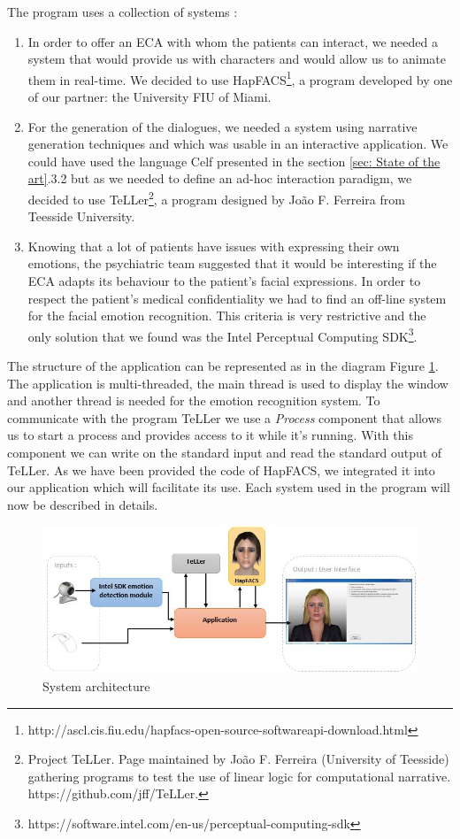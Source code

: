 \documentclass[11pt]{article}
\begin{document}
The program uses a collection of systems :
\begin{enumerate}
\item In order to offer an ECA with whom the patients can interact, we needed a system that would provide us with characters and would allow us to animate them in real-time. We decided to use HapFACS\footnote{http://ascl.cis.fiu.edu/hapfacs-open-source-softwareapi-download.html}, a program developed by one of our partner: the University FIU of Miami.
\item For the generation of the dialogues, we needed a system using narrative generation techniques and which was usable in an interactive application. We could have used the language Celf \citep{Schack08} presented in the section \ref{sec: State of the art}.3.2 but as we needed to define an ad-hoc interaction paradigm, we decided to use TeLLer\footnote{Project TeLLer. Page maintained by Jo\~{a}o F. Ferreira (University of Teesside) gathering programs to test the use of linear logic for computational narrative. https://github.com/jff/TeLLer.}, a program designed by Jo\~{a}o F. Ferreira from Teesside University.
\item Knowing that a lot of patients have issues with expressing their own emotions, the psychiatric team suggested that it would be interesting if the ECA adapts its behaviour to the patient's facial expressions. In order to respect the patient's medical confidentiality we had to find an off-line system for the facial emotion recognition. This criteria is very restrictive and the only solution that we found was the Intel\textsuperscript{\textregistered} Perceptual Computing SDK\footnote{https://software.intel.com/en-us/perceptual-computing-sdk}.
\end{enumerate}
 
The structure of the application can be represented as in the diagram Figure \ref{Figure diagram module 3}.\\
The application is multi-threaded, the main thread is used to display the window and another thread is needed for the emotion recognition system. To communicate with the program TeLLer we use a \emph{Process} component that allows us to start a process and provides access to it while it's running. With this component we can write on the standard input and read the standard output of TeLLer. As we have been provided the code of HapFACS, we integrated it into our application which will facilitate its use. Each system used in the program will now be described in details.
\begin{figure}[!ht]
   	\centerline{\includegraphics[scale=0.9]{./images/module3_diagram}}
   	\caption{\label{Figure diagram module 3} System architecture}
\end{figure}
\end{document}
